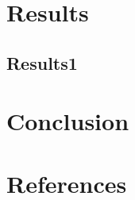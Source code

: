 \documentclass[final,3p,times,authoryear]{elsarticle}
\begin{document}
\section{Results}\label{sec:results}

\subsection{Results1}\label{sec:results1}



\section{Conclusion}\label{sec:conclusion}


\section*{References}\label{sec:ref}
 


\clearpage
%


\end{document}
